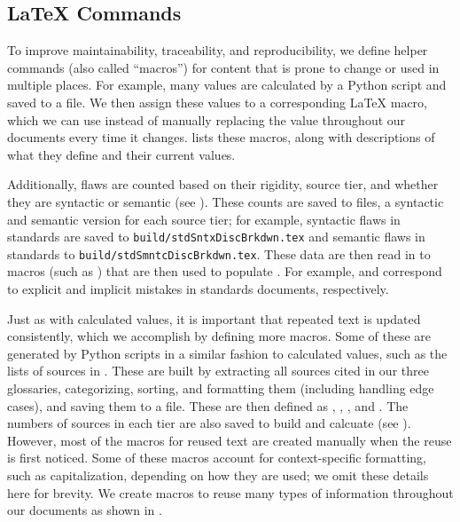 \subsection[LaTeX Commands]{\LaTeX{} Commands}\label{macros}
To improve maintainability, traceability, and reproducibility, we define
helper commands (also called ``macros'') for content that is prone to change
or used in multiple places. For example, many values are calculated by a Python
script and saved to a file. We then assign these values to a corresponding
\LaTeX{} macro, which we can use instead of manually replacing the value
throughout our documents every time it changes.  lists
these macros, along with descriptions of what they define and their current
values.



Additionally, flaws are counted based on their rigidity, source tier,
and whether they are syntactic or semantic (see
).
These counts are saved to files, a syntactic and semantic version for each
source tier; for example, syntactic flaws in standards are saved to
\texttt{build/stdSntxDiscBrkdwn.tex} and semantic flaws in standards to
\texttt{build/stdSmntcDiscBrkdwn.tex}. These data are then read in to macros
(such as ) that are then used to populate
. For example,
 and  correspond to
explicit and implicit mistakes in standards documents, respectively.

\label{text-macros}
Just as with calculated values, it is important that repeated text is updated
consistently, which we accomplish by defining more macros. Some of these are
generated by Python scripts in a similar fashion to calculated values, such as
the lists of sources in . These are built by extracting all
sources cited in our three glossaries, categorizing, sorting, and formatting
them (including handling edge cases), and saving them to a file. These are then
defined as , , , and
.
The numbers of sources in each tier are also saved to build 
and calcuate  (see ). However, most of the
macros for reused text are created manually when the reuse is first noticed.
Some of these macros account for context-specific formatting, such as
capitalization, depending on how they are used; we omit these details here for
brevity. We create macros to reuse many types of information throughout our
documents as shown in .


